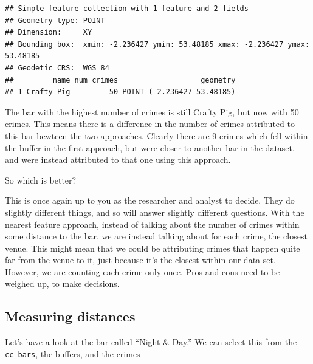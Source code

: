 \documentclass[
]{book}
\newenvironment{Shaded}{\begin{snugshade}}{\end{snugshade}}
\newcommand{\DecValTok}[1]{\textcolor[rgb]{0.00,0.00,0.81}{#1}}
\newcommand{\FunctionTok}[1]{\textcolor[rgb]{0.00,0.00,0.00}{#1}}
\newcommand{\NormalTok}[1]{#1}
\newcommand{\OtherTok}[1]{\textcolor[rgb]{0.56,0.35,0.01}{#1}}
\newcommand{\SpecialCharTok}[1]{\textcolor[rgb]{0.00,0.00,0.00}{#1}}
\newcommand{\StringTok}[1]{\textcolor[rgb]{0.31,0.60,0.02}{#1}}
\begin{document}
\begin{verbatim}
## Simple feature collection with 1 feature and 2 fields
## Geometry type: POINT
## Dimension:     XY
## Bounding box:  xmin: -2.236427 ymin: 53.48185 xmax: -2.236427 ymax: 53.48185
## Geodetic CRS:  WGS 84
##         name num_crimes                   geometry
## 1 Crafty Pig         50 POINT (-2.236427 53.48185)
\end{verbatim}

The bar with the highest number of crimes is still Crafty Pig, but now with 50 crimes. This means there is a difference in the number of crimes attributed to this bar bewteen the two approaches. Clearly there are 9 crimes which fell within the buffer in the first approach, but were closer to another bar in the dataset, and were instead attributed to that one using this approach.

So which is better?

This is once again up to you as the researcher and analyst to decide. They do slightly different things, and so will answer slightly different questions. With the nearest feature approach, instead of talking about the number of crimes within some distance to the bar, we are instead talking about for each crime, the closest venue. This might mean that we could be attributing crimes that happen quite far from the venue to it, just because it's the closest within our data set. However, we are counting each crime only once. Pros and cons need to be weighed up, to make decisions.

\hypertarget{measuring-distances}{%
\subsection{Measuring distances}\label{measuring-distances}}

Let's have a look at the bar called ``Night \& Day.'' We can select this from the \texttt{cc\_bars}, the buffers, and the crimes

\begin{Shaded}
\end{Shaded}
\end{document}
